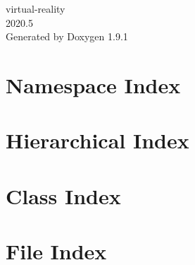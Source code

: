 \let\mypdfximage\pdfximage\def\pdfximage{\immediate\mypdfximage}\documentclass[twoside]{book}
\newcommand{\+}{\discretionary{\mbox{\scriptsize$\hookleftarrow$}}{}{}}
\newcommand{\clearemptydoublepage}{%
  \newpage{\pagestyle{empty}\cleardoublepage}%
}
\begin{document}
\raggedbottom

\hypersetup{pageanchor=false,
             bookmarksnumbered=true,
             pdfencoding=unicode
            }
\begin{titlepage}
\vspace*{7cm}
\begin{center}%
{\Large virtual-\/reality \\[1ex]\large 2020.\+5 }\\
\vspace*{1cm}
{\large Generated by Doxygen 1.9.1}\\
\end{center}
\end{titlepage}
\clearemptydoublepage
{}
\tableofcontents
\clearemptydoublepage
{}
\hypersetup{pageanchor=true}

\chapter{Namespace Index}

\chapter{Hierarchical Index}

\chapter{Class Index}

\chapter{File Index}

\end{document}
